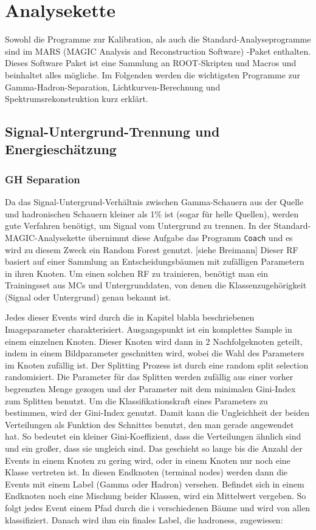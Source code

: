 \chapter{Analysekette}
Sowohl die Programme zur Kalibration, als auch die Standard-Analyseprogramme sind im MARS (MAGIC Analysis and Reconstruction Software) -Paket enthalten.
Dieses Software Paket ist eine Sammlung an ROOT-Skripten und Macros und beinhaltet alles mögliche.
Im Folgenden werden die wichtigsten Programme zur Gamma-Hadron-Separation, Lichtkurven-Berechnung und Spektrumsrekonstruktion kurz erklärt.


\section{Signal-Untergrund-Trennung und Energieschätzung}
\subsection{GH Separation}
Da das Signal-Untergrund-Verhältnis zwischen Gamma-Schauern aus der Quelle und hadronischen Schauern kleiner als 1\% ist (sogar für helle Quellen), werden gute Verfahren benötigt, um Signal vom Untergrund zu trennen.
In der Standard-MAGIC-Analysekette übernimmt diese Aufgabe das Programm \texttt{Coach} und es wird zu diesem Zweck ein Random Forest genutzt. [siehe Breimann]
Dieser RF basiert auf einer Sammlung an Entscheidungsbäumen mit zufälligen Parametern in ihren Knoten.
Um einen solchen RF zu trainieren, benötigt man ein Trainingsset aus MCs und Untergrunddaten, von denen die Klassenzugehörigkeit (Signal oder Untergrund) genau bekannt ist.

Jedes dieser Events wird durch die in Kapitel blabla beschriebenen Imageparameter charakterisiert.
Ausgangspunkt ist ein komplettes Sample in einem einzelnen Knoten.
Dieser Knoten wird dann in 2 Nachfolgeknoten geteilt, indem in einem Bildparameter geschnitten wird, wobei die Wahl des Parameters im Knoten zufällig ist.
Der Splitting Prozess ist durch eine random split selection randomisiert.
Die Parameter für das Splitten werden zufällig aus einer vorher begrenzten Menge gezogen und der Parameter mit dem minimalen Gini-Index zum Splitten benutzt.
Um die Klassifikationskraft eines Parameters zu bestimmen, wird der Gini-Index genutzt.
Damit kann die Ungleichheit der beiden Verteilungen als Funktion des Schnittes benutzt, den man gerade angewendet hat.
So bedeutet ein kleiner Gini-Koeffizient, dass die Verteilungen ähnlich sind und ein großer, dass sie ungleich sind. 
Das geschieht so lange bis die Anzahl der Events in einem Knoten zu gering wird, oder in einem Knoten nur noch eine Klasse vertreten ist.
In diesen Endknoten (terminal nodes) werden dann die Events mit einem Label (Gamma oder Hadron) versehen. 
Befindet sich in einem Endknoten noch eine Mischung beider Klassen, wird ein Mittelwert vergeben.
So folgt jedes Event einem Pfad durch die i verschiedenen Bäume und wird von allen klassifiziert.
Danach wird ihm ein finales Label, die hadroness, zugewiesen:

